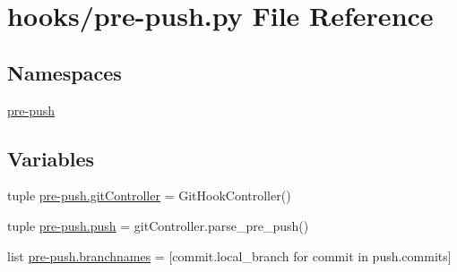 \section{hooks/pre-\/push.py File Reference}
\label{pre-push_8py}
\subsection*{Namespaces}
\begin{DoxyCompactItemize}
\item 
\hyperlink{namespacepre-push}{pre-\/push}
\end{DoxyCompactItemize}
\subsection*{Variables}
\begin{DoxyCompactItemize}
\item 
tuple \hyperlink{namespacepre-push_a8c127aba641727d65b14a0f4aad44a1c}{pre-\/push.\-git\-Controller} = Git\-Hook\-Controller()
\item 
tuple \hyperlink{namespacepre-push_a71bb0fe33ffeefadee67d3dbbe085080}{pre-\/push.\-push} = git\-Controller.\-parse\-\_\-pre\-\_\-push()
\item 
list \hyperlink{namespacepre-push_a78ac8288356df9910db91d02884f211c}{pre-\/push.\-branchnames} = \mbox{[}commit.\-local\-\_\-branch for commit in push.\-commits\mbox{]}
\end{DoxyCompactItemize}
